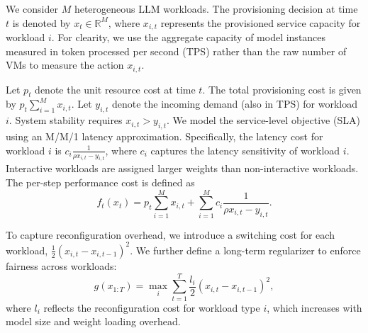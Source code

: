 We consider $M$ heterogeneous LLM workloads. The provisioning decision at time $t$ is denoted by $x_t \in \mathbb{R}^M$, where $x_{i,t}$ represents the provisioned service capacity for workload $i$. For clearity, we use the aggregate capacity of model instances measured in token processed per second (TPS) rather than the raw number of VMs to measure the action $x_{i,t}$.

Let $p_t$ denote the unit resource cost at time $t$. The total provisioning cost is given by $p_t \sum_{i=1}^M x_{i,t}$. Let $y_{i,t}$ denote the incoming demand (also in TPS) for workload $i$. System stability requires $x_{i,t} > y_{i,t}$. We model the service-level objective (SLA) using an M/M/1 latency approximation. Specifically, the latency cost for workload $i$ is $c_i \frac{1}{\rho x_{i,t} - y_{i,t}}$, where $c_i$ captures the latency sensitivity of workload $i$. Interactive workloads are assigned larger weights than non-interactive workloads. The per-step performance cost is defined as
\begin{equation}
    f_t(x_t) = p_t \sum_{i=1}^M x_{i,t} + \sum_{i=1}^M c_i \frac{1}{\rho x_{i,t} - y_{i,t}}.
\end{equation}

To capture reconfiguration overhead, we introduce a switching cost for each workload, 
$\frac{1}{2}(x_{i,t} - x_{i,t-1})^2$.
We further define a long-term regularizer to enforce fairness across workloads:
\begin{equation}
    g(x_{1:T}) = \max_{i} \sum_{t=1}^T \frac{l_i}{2}(x_{i,t} - x_{i,t-1})^2,
\end{equation}
where $l_i$ reflects the reconfiguration cost for workload type $i$, which increases with model size and weight loading overhead.



